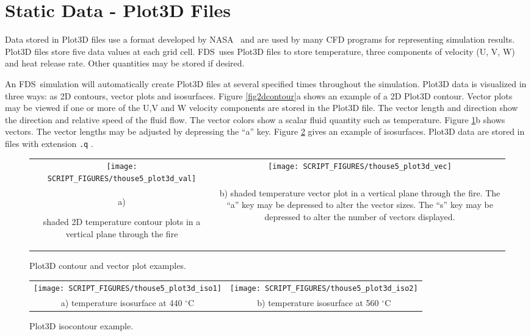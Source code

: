 \documentclass[11pt,twoside]{book}
\newcommand{\degC}{$^\circ$C}
\newcommand{\figoptions}{hbp}
\newcommand{\FDS}{{FDS}}
\newcommand{\fds}{{FDS}}
\begin{document}
\section{Static Data - Plot3D Files} Data stored in Plot3D files
use a format developed by NASA~\cite{PLOT3D} and are used by many
CFD programs for representing simulation results. Plot3D files
store five data values at each grid cell. \FDS\ uses Plot3D files
to store temperature, three components of velocity (U, V, W) and
heat release rate. Other quantities may be stored if desired.

An \fds\ simulation will automatically  create Plot3D files at several
specified times throughout the simulation. Plot3D data is
visualized in three ways: as 2D contours, vector plots and
isosurfaces. Figure \ref{fig2dcontour}a shows an example of a 2D
Plot3D contour. Vector plots may be viewed if one or more of the
U,V and W velocity components are stored in the Plot3D file. The
vector length and direction show the direction and relative speed
of the fluid flow. The vector colors show a scalar fluid quantity
such as temperature. Figure \ref{figvector2}b shows vectors.
The vector lengths may be adjusted by depressing the
``a'' key.  Figure \ref{fig3dcontour}
gives an example of isosurfaces.
Plot3D data are stored in files with extension {\tt .q} .

\begin{figure}[\figoptions]
\begin{center}
\begin{tabular}{cc}
\texttt{[image: SCRIPT\_FIGURES/thouse5\_plot3d\_val]}
&\texttt{[image: SCRIPT\_FIGURES/thouse5\_plot3d\_vec]}\\
a)

\parbox[t]{2.5in}{shaded 2D temperature contour plots in a vertical plane through the fire}
&
b)
\parbox[t]{2.5in}{shaded temperature vector plot in a vertical plane through the fire.
The ``a'' key may be depressed to alter the vector sizes.
The ``s'' key may be depressed to alter the number of vectors displayed.
}
\end{tabular}
\end{center}
\caption{Plot3D contour and vector plot examples.  }
\label{fig2dcontour}%
\label{figvector2}
\end{figure}

\begin{figure}[\figoptions]
\begin{center}
\begin{tabular}{cc}
\texttt{[image: SCRIPT\_FIGURES/thouse5\_plot3d\_iso1]}
&\texttt{[image: SCRIPT\_FIGURES/thouse5\_plot3d\_iso2]}\\
a) temperature isosurface at 440 \degC&b) temperature
isosurface at 560 \degC
\end{tabular}
\end{center}
\caption{Plot3D isocontour example.}
\label{fig3dcontour}%
\end{figure}
\end{document}
